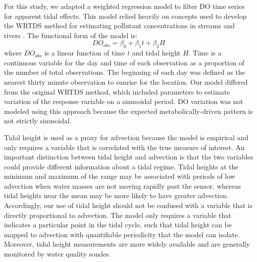 \documentclass[letterpaper,12pt,oneside]{article}\usepackage[]{graphicx}\usepackage[]{color}
\begin{document}
For this study, we adapted a weighted regression model to filter \ac{DO} time series for apparent tidal effects.  This model relied heavily on concepts used to develop the \ac{WRTDS} method for estimating pollutant concentrations in streams and rivers \citep{Hirsch10}.  The functional form of the model is:
\begin{equation}\label{funform}
DO_{obs}= \beta_0 + \beta_1 t + \beta_2 H
\end{equation}
where $DO_{obs}$ is a linear function of time $t$ and tidal height $H$.  Time is a continuous variable for the day and time of each observation as a proportion of the number of total observations.  The beginning of each day was defined as the nearest thirty minute observation to sunrise for the location.  Our model differed from the original \ac{WRTDS} method, which included parameters to estimate variation of the response variable on a sinusoidal period.  \ac{DO} variation was not modeled using this approach because the expected metabolically-driven pattern is not strictly sinusoidal.  

Tidal height is used as a proxy for advection because the model is empirical and only requires a variable that is correlated with the true measure of interest.  An important distinction between tidal height and advection is that the two variables could provide different information about a tidal regime.  Tidal heights at the minimum and maximum of the range may be associated with periods of low advection when water masses are not moving rapidly past the sensor, whereas tidal heights near the mean may be more likely to have greater advection.  Accordingly, our use of tidal height should not be confused with a variable that is directly proportional to advection.  The model only requires a variable that indicates a particular point in the tidal cycle, such that tidal height can be mapped to advection with quantifiable periodicity that the model can isolate.  Moreover, tidal height measurements are more widely available and are generally monitored by water quality sondes.    
\end{document}
